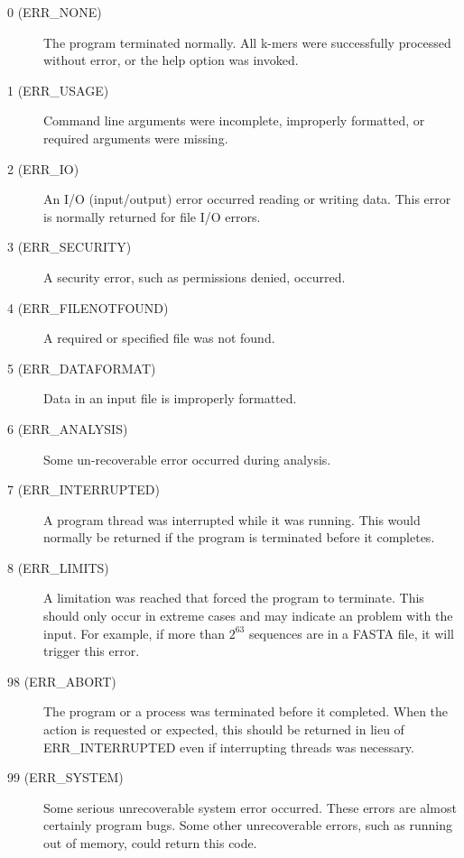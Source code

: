 \begin{description}
\item[0 (ERR\_NONE)] The program terminated normally. All k-mers were successfully processed without error, or the help option was invoked.

\item[1 (ERR\_USAGE)] Command line arguments were incomplete, improperly formatted, or required arguments were missing.

\item[2 (ERR\_IO)] An I/O (input/output) error occurred reading or writing data. This error is normally returned for file I/O errors.

\item[3 (ERR\_SECURITY)] A security error, such as permissions denied, occurred.

\item[4 (ERR\_FILENOTFOUND)] A required or specified file was not found.

\item[5 (ERR\_DATAFORMAT)] Data in an input file is improperly formatted. 

\item[6 (ERR\_ANALYSIS)] Some un-recoverable error occurred during analysis.

\item[7 (ERR\_INTERRUPTED)] A program thread was interrupted while it was running. This would normally be returned if the program is terminated before it completes.

\item[8 (ERR\_LIMITS)] A limitation was reached that forced the program to terminate. This should only occur in extreme cases and may indicate an problem with the input. For example, if more than $2^{63}$ sequences are in a FASTA file, it will trigger this error.

\item[98 (ERR\_ABORT)] The program or a process was terminated before it completed. When the action is requested or expected, this should be returned in lieu of ERR\_INTERRUPTED even if interrupting threads was necessary.

\item[99 (ERR\_SYSTEM)] Some serious unrecoverable system error occurred. These errors are almost certainly program bugs. Some other unrecoverable errors, such as running out of memory, could return this code.

\end{description}



